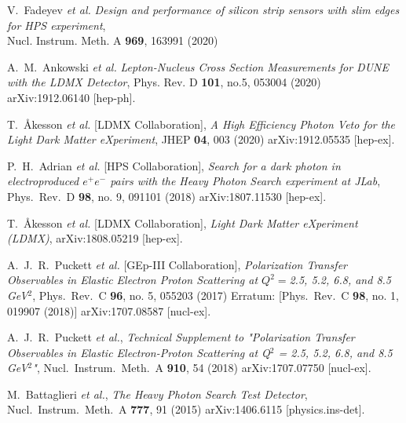 \documentclass[11pt]{article}
\begin{document}
    \begin{thebibliography}{99}
        V.~Fadeyev {\it et al.} 
        \emph{Design and performance of silicon strip sensors with slim edges for HPS experiment},
        \\ Nucl. Instrum. Meth. A \textbf{969}, 163991 (2020)
    
        A.~M.~Ankowski {\it et al.}
        \emph{Lepton-Nucleus Cross Section Measurements for DUNE with the LDMX Detector},
        Phys. Rev. D \textbf{101}, no.5, 053004 (2020)  
        arXiv:1912.06140 [hep-ph].

        T.~Åkesson {\it et al.} [LDMX Collaboration],
        \emph{A High Efficiency Photon Veto for the Light Dark Matter eXperiment},
        JHEP \textbf{04}, 003 (2020)
        arXiv:1912.05535 [hep-ex].

         P.~H.~Adrian {\it et al.} [HPS Collaboration],
         \emph{Search for a dark photon in electroproduced $e^{+}e^{-}$ pairs with the Heavy Photon Search experiment at JLab},
         Phys.\ Rev.\ D {\bf 98}, no. 9, 091101 (2018)
         arXiv:1807.11530 [hep-ex].
        
         T.~Åkesson {\it et al.} [LDMX Collaboration],
         \emph{Light Dark Matter eXperiment (LDMX)},
            arXiv:1808.05219 [hep-ex].

         A.~J.~R.~Puckett {\it et al.} [GEp-III Collaboration],
         \emph{Polarization Transfer Observables in Elastic Electron Proton Scattering at $Q^2 = $2.5, 5.2, 6.8, and 8.5 GeV$^2$},
         Phys.\ Rev.\ C {\bf 96}, no. 5, 055203 (2017)
         Erratum: [Phys.\ Rev.\ C {\bf 98}, no. 1, 019907 (2018)]
         arXiv:1707.08587 [nucl-ex].

         A.~J.~R.~Puckett {\it et al.},
         \emph{Technical Supplement to "Polarization Transfer Observables in Elastic Electron-Proton Scattering at Q$^2$ = 2.5, 5.2, 6.8, and 8.5 GeV$^2$"},
         Nucl.\ Instrum.\ Meth.\ A {\bf 910}, 54 (2018)
         arXiv:1707.07750 [nucl-ex].

         M.~Battaglieri {\it et al.},
         \emph{The Heavy Photon Search Test Detector},
         Nucl.\ Instrum.\ Meth.\ A {\bf 777}, 91 (2015)
         arXiv:1406.6115 [physics.ins-det].


\end{thebibliography}
\end{document}
